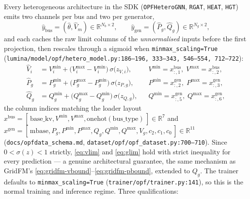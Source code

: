 \documentclass[11pt]{article}
\newcommand{\pred}[1]{\widehat{#1}}
\newcommand{\code}[1]{\texttt{\small #1}}
\newcommand{\Real}{\mathbb{R}}
\newcommand{\sig}{\sigma}
\begin{document}
Every heterogeneous architecture in the SDK (\code{OPFHeteroGNN}, \code{RGAT}, \code{HEAT},
\code{HGT}) emits two channels per bus and two per generator,
\begin{equation}
\pred{y}_{\mathrm{bus}}=(\pred\theta,\pred{V}_m)\in\Real^{N_b\times 2},
\qquad
\pred{y}_{\mathrm{gen}}=(\pred{P}_g,\pred{Q}_g)\in\Real^{N_g\times 2},
\label{eq:lum-heads}
\end{equation}
and each caches the raw limit columns of the \emph{unnormalised} inputs before the first
projection, then rescales through a sigmoid when \code{minmax\_scaling=True}
(\code{lumina/model/opf/hetero\_model.py:186--196, 333--343, 546--554, 712--722}):
\begin{align}
\pred{V}_i &= V^{\min}_i+\big(V^{\max}_i-V^{\min}_i\big)\,\sig\!\big(z_{V,i}\big),
&& V^{\min}=x^{\mathrm{bus}}_{:,1},\; V^{\max}=x^{\mathrm{bus}}_{:,2},
\label{eq:lum-v}\\
\pred{P}_g &= P^{\min}_g+\big(P^{\max}_g-P^{\min}_g\big)\,\sig\!\big(z_{P,g}\big),
&& P^{\min}=x^{\mathrm{gen}}_{:,2},\; P^{\max}=x^{\mathrm{gen}}_{:,3},
\label{eq:lum-p}\\
\pred{Q}_g &= Q^{\min}_g+\big(Q^{\max}_g-Q^{\min}_g\big)\,\sig\!\big(z_{Q,g}\big),
&& Q^{\min}=x^{\mathrm{gen}}_{:,5},\; Q^{\max}=x^{\mathrm{gen}}_{:,6},
\label{eq:lum-q}
\end{align}
the column indices matching the loader layout
$x^{\mathrm{bus}}=[\,\mathrm{base\_kv},V^{\min},V^{\max},\mathrm{onehot}(\mathrm{bus\_type})\,]\in\Real^{7}$
and
$x^{\mathrm{gen}}=[\,\mathrm{mbase},P_g,P^{\min},P^{\max},Q_g,Q^{\min},Q^{\max},V_g,c_2,c_1,c_0\,]\in\Real^{11}$
(\code{docs/opfdata\_schema.md}, \code{dataset/opf/opf\_dataset.py:700--710}). Since
$0<\sig(z)<1$ strictly, \eqref{eq:vlim} and \eqref{eq:glim} hold with strict inequality for
every prediction --- a genuine architectural guarantee, the same mechanism as GridFM's
\eqref{eq:gridfm-vbound}--\eqref{eq:gridfm-pbound}, extended to $Q_g$. The trainer defaults
to \code{minmax\_scaling=True} (\code{trainer/opf/trainer.py:141}), so this is the normal
training and inference regime. Three qualifications:
\end{document}
